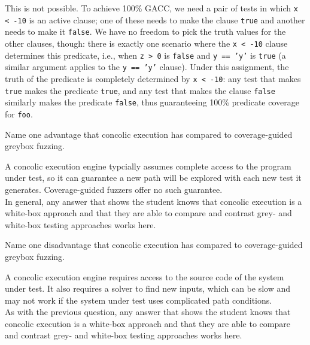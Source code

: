 \documentclass[addpoints, answers]{exam}
\newcommand{\Code}[1]{\texttt{#1}}
\begin{document}
\begin{questions}
\begin{parts}
  \begin{solution} This is not possible. To achieve 100\% GACC, we
    need a pair of tests in which \Code{x < -10} is an
    active clause; one of these needs to make the clause
    \Code{true} and another needs to make it %
    \Code{false}. We have no freedom to pick the truth
    values for the other clauses, though: there is exactly one
    scenario where the \Code{x < -10} clause determines
    this predicate, i.e., when \Code{z > 0} is
    \Code{false} and %
    \Code{y == 'y'} is \Code{true} (a similar
    argument applies to the \Code{y == 'y'} clause). Under
    this assignment, the truth of the predicate is completely
    determined by \Code{x < -10}: any test that makes
    \Code{true} makes the predicate
    \Code{true}, and any test that makes the clause
    \Code{false} similarly makes the predicate
    \Code{false}, thus guaranteeing 100\% predicate
    coverage for \Code{foo}.
  \end{solution}
\end{parts}


\vspace{-.3cm}
\question[1] Name one advantage that concolic execution has compared
  to coverage-guided greybox fuzzing. %
  \begin{solution}
    A concolic execution engine typcially assumes complete access to
    the program under test, so it can guarantee a new path will be
    explored with each new test it generates. Coverage-guided fuzzers
    offer no such guarantee. \\
    In general, any answer that shows the student knows that concolic
    execution is a white-box approach and that they are able to
    compare and contrast grey- and white-box testing approaches works
    here.
  \end{solution}

  \vspace{-.3cm}
\question[1] Name one disadvantage that concolic execution has
  compared to coverage-guided greybox fuzzing. %
  \begin{solution}
    A concolic execution engine requires access to the source code of
    the system under test. It also requires a solver to find new
    inputs, which can be slow and may not work if the system under
    test uses complicated path conditions. \\ %
    As with the previous question, any answer that shows the student
    knows that concolic execution is a white-box approach and that
    they are able to compare and contrast grey- and white-box testing
    approaches works here.
  \end{solution}



\end{questions}
\end{document}
